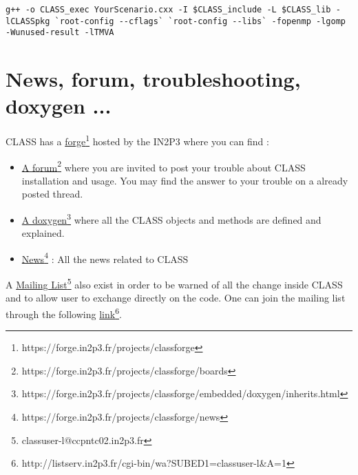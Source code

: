 \begin{center}
\begin{minipage}{\textwidth}
\begin{lstlisting}[style=terminal]
g++ -o CLASS_exec YourScenario.cxx -I $CLASS_include -L $CLASS_lib -lCLASSpkg `root-config --cflags` `root-config --libs` -fopenmp -lgomp -Wunused-result -lTMVA
\end{lstlisting}
\end{minipage}
\end{center}

\chapter{News, forum, troubleshooting, doxygen ...}
CLASS has a \href{https://forge.in2p3.fr/projects/classforge}{forge}\footnote{https://forge.in2p3.fr/projects/classforge} hosted by the IN2P3  where you can find :

\begin{itemize}
\item \href{https://forge.in2p3.fr/projects/classforge/boards}{A forum}\footnote{https://forge.in2p3.fr/projects/classforge/boards} where you are invited to post your trouble about CLASS installation and usage. You may find the answer to your trouble on a already posted thread.
\item \href{https://forge.in2p3.fr/projects/classforge/embedded/doxygen/inherits.html}{A doxygen}\footnote{https://forge.in2p3.fr/projects/classforge/embedded/doxygen/inherits.html} where all the CLASS objects and methods are defined and explained.
\item \href{https://forge.in2p3.fr/projects/classforge/news}{News}\footnote{https://forge.in2p3.fr/projects/classforge/news} : All the news related to CLASS
\end{itemize}
A \href{classuser-l@ccpntc02.in2p3.fr}{Mailing List}\footnote{classuser-l@ccpntc02.in2p3.fr} also exist in order to be warned of all the change inside CLASS and to allow user to exchange directly on the code. One can join the mailing list through the following  \href{http://listserv.in2p3.fr/cgi-bin/wa?SUBED1=classuser-l&A=1}{link}\footnote{http://listserv.in2p3.fr/cgi-bin/wa?SUBED1=classuser-l\&A=1}.